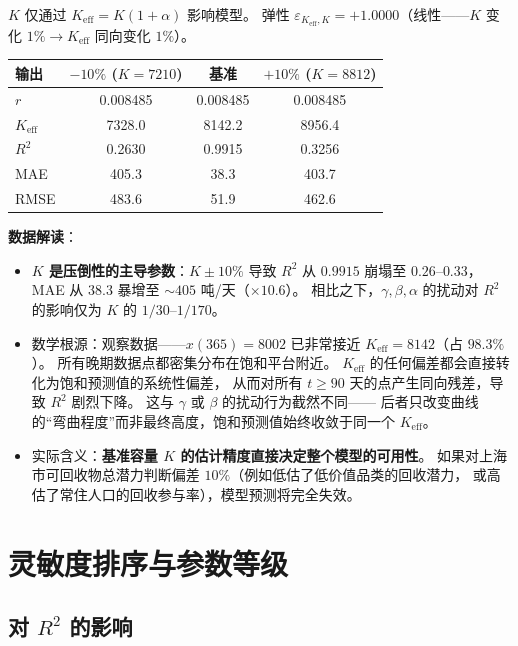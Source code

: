 \documentclass[12pt,a4paper]{article}
\begin{document}
$K$ 仅通过 $K_{\text{eff}} = K(1+\alpha)$ 影响模型。
弹性 $\varepsilon_{K_{\text{eff}},K} = +1.0000$（线性——$K$ 变化 $1\% \to K_{\text{eff}}$ 同向变化 $1\%$）。

\begin{center}
\begin{tabular}{lccc}
\toprule
输出 & $-10\%$ ($K = 7210$) & 基准 & $+10\%$ ($K = 8812$) \\
\midrule
$r$      & 0.008485 & 0.008485 & 0.008485 \\
$K_{\text{eff}}$ & 7328.0 & 8142.2 & 8956.4 \\
$R^2$    & 0.2630 & 0.9915 & 0.3256 \\
MAE      & 405.3 & 38.3 & 403.7 \\
RMSE     & 483.6 & 51.9 & 462.6 \\
\bottomrule
\end{tabular}
\end{center}

\textbf{数据解读}：
\begin{itemize}
  \item \textbf{$K$ 是压倒性的主导参数}：$K \pm 10\%$ 导致 $R^2$ 从 $0.9915$ 崩塌至 $0.26$--$0.33$，
        MAE 从 $38.3$ 暴增至 $\sim 405$ 吨/天（$\times 10.6$）。
        相比之下，$\gamma, \beta, \alpha$ 的扰动对 $R^2$ 的影响仅为 $K$ 的 $1/30$--$1/170$。
  \item 数学根源：观察数据——$x(365) = 8002$ 已非常接近 $K_{\text{eff}} = 8142$（占 $98.3\%$）。
        所有晚期数据点都密集分布在饱和平台附近。
        $K_{\text{eff}}$ 的任何偏差都会直接转化为饱和预测值的系统性偏差，
        从而对所有 $t \geq 90$ 天的点产生同向残差，导致 $R^2$ 剧烈下降。
        这与 $\gamma$ 或 $\beta$ 的扰动行为截然不同——
        后者只改变曲线的``弯曲程度''而非最终高度，饱和预测值始终收敛于同一个 $K_{\text{eff}}$。
  \item 实际含义：\textbf{基准容量 $K$ 的估计精度直接决定整个模型的可用性}。
        如果对上海市可回收物总潜力判断偏差 $10\%$（例如低估了低价值品类的回收潜力，
        或高估了常住人口的回收参与率），模型预测将完全失效。
\end{itemize}

\section{灵敏度排序与参数等级}

\subsection{对 $R^2$ 的影响}
\end{document}
